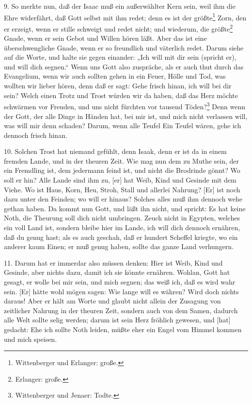 9. So merkte nun, daß der Isaac muß ein außerwählter Kern sein, weil ihm die Ehre widerfährt, daß Gott selbst mit ihm redet; denn es ist der größte\footnote{Wittenberger und Erlanger: große.} Zorn, den er erzeigt, wenn er stille schweigt und redet nicht; und wiederum, die größte\footnote{Erlanger: große.} Gnade, wenn er sein Gebot und Willen hören läßt. Aber das ist eine überschwengliche Gnade, wenn er so freundlich und väterlich redet. Darum siehe auf die Worte, und halte sie gegen einander: „Ich will mit dir sein (spricht er), und will dich segnen.“ Wenn uns Gott also zuspräche, als er auch thut durch das Evangelium, wenn wir auch sollten gehen in ein Feuer, Hölle und Tod, was wollten wir lieber hören, denn daß er sagt: Gehe frisch hinan,
ich will bei dir sein? Welch einen Trotz und Trost würden wir da haben, daß das Herz möchte schwärmen vor Freuden, und uns nicht fürchten vor tausend Töden?\footnote{Wittenberger und Jenaer: Todte.} Denn wenn der Gott, der alle Dinge in Händen hat, bei mir ist, und mich nicht verlassen will, was will mir denn schaden? Darum, wenn alle Teufel Ein Teufel wären, gehe ich dennoch frisch hinan.

10. Solchen Trost hat niemand gefühlt, denn Isaak, denn er ist da in einem fremden Lande, und in der theuren Zeit. Wie mag nun dem zu Muthe sein, der ein Fremdling ist, dem jedermann feind ist, und nicht die Brodrinde gönnt? Wo soll er hin? Alle Lande sind ihm zu, [er] hat Weib, Kind und Gesinde mit dem Viehe. Wo ist Haus, Korn, Heu, Stroh, Stall und allerlei Nahrung? [Er] ist noch dazu unter den Feinden; wo will er hinaus? Solches alles muß ihm dennoch wehe gethan haben. Da kommt nun Gott, und läßt ihn nicht, und spricht: Es hat keine Noth, die Theurung soll dich nicht umbringen. Zeuch nicht in Egypten, welches ein voll Land ist, sondern bleibe hier im Lande, ich will dich dennoch ernähren, daß du genug hast; als es auch geschah, daß er hundert Scheffel kriegte, wo ein anderer kaum Einen; er muß genug haben, sollte das ganze Land verhungern.

11. Darum hat er immerdar also müssen denken: Hier ist Weib, Kind und Gesinde, aber nichts dazu, damit ich sie könnte ernähren. Wohlan, Gott hat gesagt, er wolle bei mir sein, und mich segnen; das weiß ich, daß es wird wahr sein. [Er] hätte wohl mögen sagen: Wie lange will es währen? Wird doch nichts daraus! Aber er hält am Worte und glaubt nicht allein der Zusagung von zeitlicher Nahrung in der theuren Zeit, sondern auch von dem Samen, dadurch alle Welt sollte selig werden; darum ist sein Herz fröhlich gewesen, und [hat] gedacht: Ehe ich sollte Noth leiden, müßte eher ein Engel vom Himmel kommen und mich speisen.

